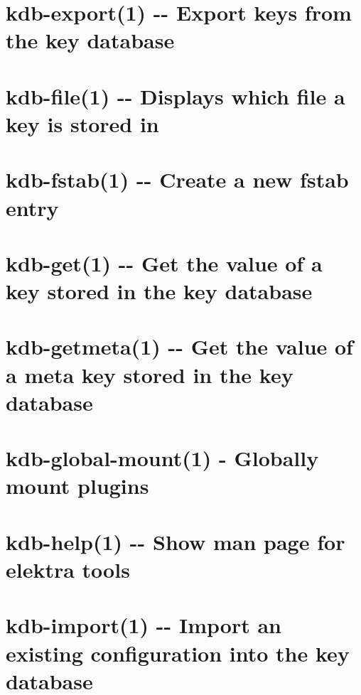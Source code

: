 \documentclass[twoside]{book}
\newcommand{\+}{\discretionary{\mbox{\scriptsize$\hookleftarrow$}}{}{}}
\begin{document}
\chapter{kdb-\/export(1) -\/-\/ Export keys from the key database}
\label{md_doc_help_kdb-export}
\hypertarget{md_doc_help_kdb-export}{}

\chapter{kdb-\/file(1) -\/-\/ Displays which file a key is stored in}
\label{md_doc_help_kdb-file}
\hypertarget{md_doc_help_kdb-file}{}

\chapter{kdb-\/fstab(1) -\/-\/ Create a new fstab entry}
\label{md_doc_help_kdb-fstab}
\hypertarget{md_doc_help_kdb-fstab}{}

\chapter{kdb-\/get(1) -\/-\/ Get the value of a key stored in the key database}
\label{md_doc_help_kdb-get}
\hypertarget{md_doc_help_kdb-get}{}

\chapter{kdb-\/getmeta(1) -\/-\/ Get the value of a meta key stored in the key database}
\label{md_doc_help_kdb-getmeta}
\hypertarget{md_doc_help_kdb-getmeta}{}

\chapter{kdb-\/global-\/mount(1) -\/ Globally mount plugins}
\label{md_doc_help_kdb-global-mount}
\hypertarget{md_doc_help_kdb-global-mount}{}

\chapter{kdb-\/help(1) -\/-\/ Show man page for elektra tools}
\label{md_doc_help_kdb-help}
\hypertarget{md_doc_help_kdb-help}{}

\chapter{kdb-\/import(1) -\/-\/ Import an existing configuration into the key database}
\label{md_doc_help_kdb-import}
\hypertarget{md_doc_help_kdb-import}{}

\end{document}
